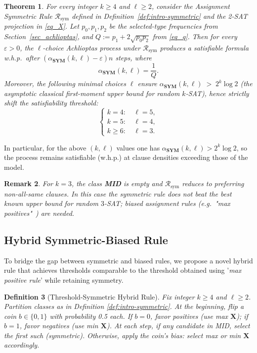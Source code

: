\documentclass[11pt,reqno]{amsart}
\numberwithin{equation}{section}
\renewcommand{\ln}{\log}
\renewcommand{\vec}[1]{\boldsymbol{#1}}
\newcommand\cR{\mathcal R}
\newcommand\vX{\vec X}
\newcommand\Def{Definition}
\newcommand\Sec{Section}
\newtheorem{definition}{Definition}[section]
\newtheorem{remark}[definition]{Remark}
\newtheorem{theorem}[definition]{Theorem}
\begin{document}
	\begin{theorem}\label{thm:main-symmetric}
		For every integer $k\ge 4$ and $\ell\ge 2$, consider the Assignment Symmetric Rule $\cR_{\mathrm{sym}}$ defined in \Def~\ref{def:intro-symmetric} and the 2-SAT projection in \eqref{eq_X}. Let $p_0,p_1,p_2$ be the selected-type frequencies from \Sec~\ref{sec_achlioptas}, and  $Q:=p_1+2\sqrt{p_0p_2}$ from \eqref{eq_q}.
		Then for every $\varepsilon>0$, the $\ell$-choice Achlioptas process under $\cR_{\mathrm{sym}}$ produces a satisfiable formula w.h.p.\ after $(\alpha_{\textbf{SYM}}(k,\ell)-\varepsilon)n$ steps, where
		\[
		\alpha_{\textbf{SYM}}(k,\ell)=\frac{1}{Q}.
		\]
		Moreover, the following minimal choices $\ell$ ensure $\alpha_{\textbf{SYM}}(k,\ell)\;>\;2^k\ln 2$ (the asymptotic classical first-moment upper bound for random $k$-SAT), hence strictly shift the satisfiability threshold:
		\[
		\begin{cases}
			k=4:& \ \ell=5,\\[2pt]
			k=5:& \ \ell=4,\\[2pt]
			k\ge 6:& \ \ell=3.
		\end{cases}
		\]
	\end{theorem}
	In particular, for the above $(k,\ell)$ values one has $\alpha_{\textbf{SYM}}(k,\ell) > 2^k\ln 2$, so the process remains satisfiable (w.h.p.) at clause densities exceeding those of the model.
	
	\begin{remark}\label{rem:intro-k3}
		For $k=3$, the class \textbf{MID} is empty and $\cR_{\mathrm{sym}}$ reduces to preferring non-all-same clauses. 
		In this case the symmetric rule does not beat the best known upper bound for random $3$-SAT; biased assignment rules (e.g.\ "max positives"~\cite{DDHM}) are needed.
	\end{remark}
	
	\subsection{Hybrid Symmetric-Biased Rule}
	To bridge the gap between symmetric and biased rules, we propose a novel hybrid rule that achieves thresholds comparable to the threshold obtained using '\emph{max positive rule}' while retaining symmetry.
	
	\begin{definition}[Threshold-Symmetric Hybrid Rule]\label{def:hybrid}
		Fix integer $k\ge 4$ and $\ell\ge 2$. Partition classes as in Definition \ref{def:intro-symmetric}. At the beginning, flip a coin \(b \in \{0,1\}\) with probability 0.5 each. If \(b=0\), favor positives (use max \(\vX\)); if \(b=1\), favor negatives (use min \(\vX\)).
		At each step, if any candidate in MID, select the first such (symmetric). Otherwise, apply the coin's bias: select max or min \(\vX\) accordingly.
	\end{definition}
	
\end{document}
